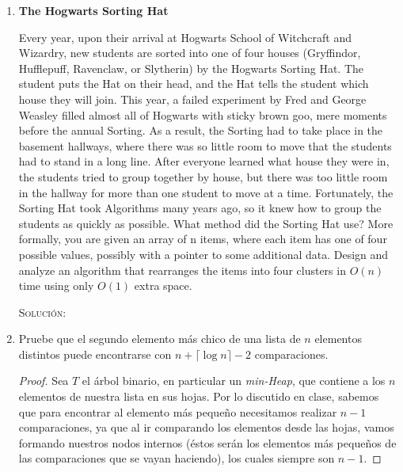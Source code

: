 \documentclass[letterpaper,11pt]{article}
\begin{document}
\begin{enumerate}
    \item \textbf{The Hogwarts Sorting Hat}

    Every year, upon their arrival at Hogwarts School of Witchcraft and Wizardry, 
    new students are sorted into one of four houses (Gryffindor, Hufflepuff, 
    Ravenclaw, or Slytherin) by the Hogwarts Sorting Hat. The student puts the 
    Hat on their head, and the Hat tells the student which house they will join. 
    This year, a failed experiment by Fred and George Weasley filled almost all 
    of Hogwarts with sticky brown goo, mere moments before the annual Sorting. 
    As a result, the Sorting had to take place in the basement hallways, where 
    there was so little room to move that the students had to stand in a long 
    line. After everyone learned what house they were in, the students tried to 
    group together by house, but there was too little room in the hallway for 
    more than one student to move at a time. Fortunately, the Sorting Hat took 
    Algorithms many years ago, so it knew how to group the students as quickly 
    as possible. What method did the Sorting Hat use? More formally, you are 
    given an array of n items, where each item has one of four possible values, 
    possibly with a pointer to some additional data. Design and analyze an 
    algorithm that rearranges the items into four clusters in $O(n)$ time 
    using only $O(1)$ extra space.

    \textsc{Solución:}

    \item Pruebe que el segundo elemento más chico de una lista de $n$ elementos 
    distintos puede encontrarse con $n + \lceil \log n \rceil - 2$ comparaciones.

    \begin{proof}
        Sea $T$ el árbol binario, en particular un \textit{min-Heap}, que 
        contiene a los $n$ elementos de nuestra lista en sus hojas. Por lo 
        discutido en clase, sabemos que para encontrar al elemento más pequeño 
        necesitamos realizar $n-1$ comparaciones, ya que al ir comparando los 
        elementos desde las hojas, vamos formando nuestros nodos internos (éstos 
        serán los elementos más pequeños de las comparaciones que se vayan 
        haciendo), los cuales siempre son $n-1$.


\end{proof}
\end{enumerate}
\end{document}
